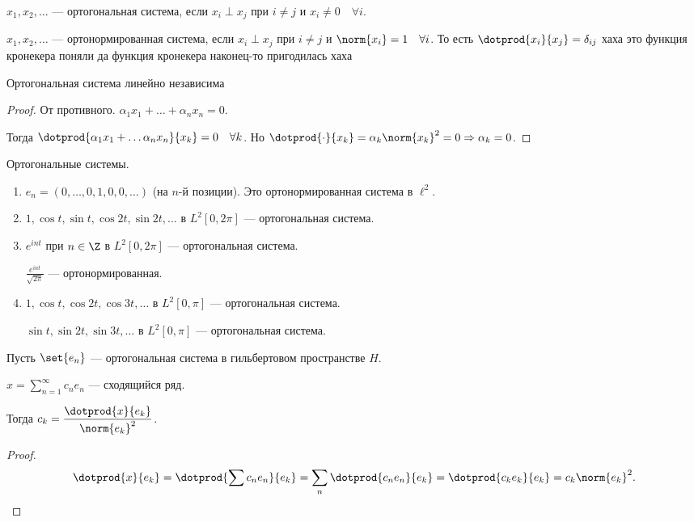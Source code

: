 \begin{definition}
    $x_1, x_2, \ldots$ --- ортогональная система, если $x_i \perp x_j$ при $i \neq j$ и $x_i \neq 0 \quad \forall i$.
\end{definition}
\begin{definition}
    $x_1, x_2, \ldots$ --- ортонормированная система, если $x_i \perp x_j$ при $i \neq j$ и $\norm{x_i} = 1\quad \forall i$.
    То есть $\dotprod{x_i}{x_j} = \delta_{ij}$ хаха это функция кронекера поняли да функция кронекера наконец-то пригодилась хаха
\end{definition}

\begin{observation}
    Ортогональная система линейно независима
\end{observation}
\begin{proof}
    От противного. $\alpha_1 x_1 + \ldots + \alpha_n x_n = 0$.

    Тогда $\dotprod{\alpha_1 x_1 + \ldots \alpha_n x_n}{x_k} = 0 \quad \forall k$.
    Но $\dotprod{\cdot}{x_k} = \alpha_k \norm{x_k}^2 = 0 \Rightarrow \alpha_k = 0$.
\end{proof}

\begin{examples} Ортогональные системы.
    \begin{enumerate}
        \item $e_n = (0, \ldots, 0, 1, 0, 0, \ldots)$ (на $n$-й позиции). Это ортонормированная система в $\ell^2$.
        \item $1, \cos t, \sin t, \cos 2t, \sin 2t, \ldots$ в $L^2[0, 2\pi]$ --- ортогональная система.
        \item $e^{i n t}$ при $n \in \Z$ в $L^2[0, 2\pi]$ --- ортогональная система.

              $\frac{e^{int}}{\sqrt{2\pi}}$ --- ортонормированная.
        \item $1, \cos t, \cos 2t, \cos 3t, \ldots$ в $L^2[0, \pi]$ --- ортогональная система.

              $\sin t, \sin 2t, \sin 3t, \ldots$ в $L^2[0, \pi]$ --- ортогональная система.
    \end{enumerate}
\end{examples}

\begin{theorem}
    Пусть $\set{e_n}$ --- ортогональная система в гильбертовом пространстве $H$.

    $x = \sum\limits_{n=1}^\infty c_n e_n$ --- сходящийся ряд.

    Тогда $c_k = \dfrac{\dotprod{x}{e_k}}{\norm{e_k}^2}$.
\end{theorem}
\begin{proof}
    \[
        \dotprod{x}{e_k} = \dotprod{\sum c_n e_n}{e_k} = \sum\limits_n \dotprod{c_n e_n}{e_k} = \dotprod{c_k e_k}{e_k} = c_k \norm{e_k}^2
        .\]
\end{proof}

